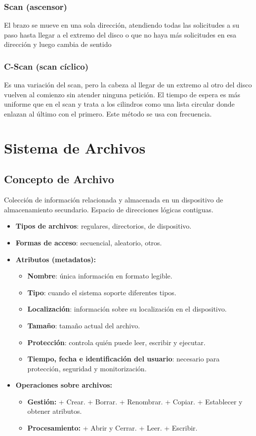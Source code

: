 \documentclass[10pt,a4paper]{article}
\begin{document}
\subsubsection{Scan (ascensor)}
El brazo se mueve en una sola dirección, atendiendo todas las solicitudes a su paso hasta llegar a el extremo del disco o que no haya más solicitudes en esa dirección y luego cambia de sentido

\subsubsection{C-Scan (scan cíclico)}
Es una variación del scan, pero la cabeza al llegar de un extremo al otro del disco vuelven al comienzo sin atender ninguna petición. El tiempo de espera es más uniforme que en el scan y trata a los cilindros como una lista circular donde enlazan al último con el primero. Este método se usa con frecuencia.

\section{Sistema de Archivos}

\subsection{Concepto de Archivo}
Colección de información relacionada y almacenada en un dispositivo de almacenamiento secundario. Espacio de direcciones lógicas contiguas.
\begin{itemize}
\item \textbf{Tipos de archivos}: regulares, directorios, de dispositivo.
\item \textbf{Formas de acceso}: secuencial, aleatorio, otros.
\item \textbf{Atributos (metadatos):}
\begin{itemize}
\item \textbf{Nombre}: única información en formato legible.
\item \textbf{Tipo}: cuando el sistema soporte diferentes tipos.
\item \textbf{Localización}: información sobre su localización en el dispositivo.
\item \textbf{Tamaño}: tamaño actual del archivo.
\item \textbf{Protección}: controla quién puede leer, escribir y ejecutar.
\item \textbf{Tiempo, fecha e identificación del usuario}: necesario para protección, seguridad y monitorización.
\end{itemize}

\item \textbf{Operaciones sobre archivos:}
\begin{itemize}
\item \textbf{Gestión:}
\subitem + Crear.
\subitem + Borrar.
\subitem + Renombrar.
\subitem + Copiar.
\subitem + Establecer y obtener atributos.
\item \textbf{Procesamiento:}
\subitem + Abrir y Cerrar.
\subitem + Leer.
\subitem + Escribir.
\end{itemize}
\end{itemize}
\end{document}
